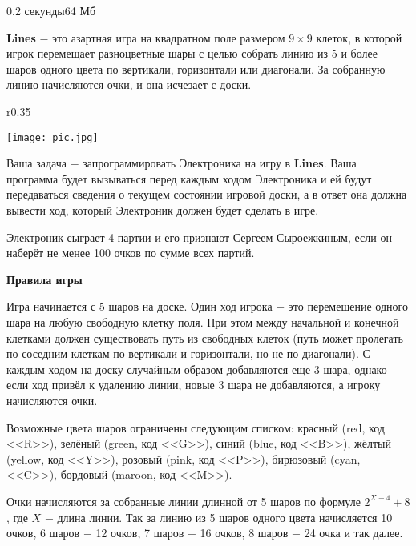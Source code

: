 \begin{problem}{}{}{}{0.2 секунды}{64 Мб}


{\bf {Lines}} $-$ это азартная игра на квадратном поле размером $9\times 9$ клеток, 
в которой игрок перемещает разноцветные шары с целью собрать линию из 5 и более шаров 
одного цвета по вертикали, горизонтали или диагонали. За собранную линию начисляются очки, и она исчезает с доски.

\begin{wrapfigure}{r}{0.35\textwidth}
\vspace{-20pt}
  \begin{center}
    \texttt{[image: pic.jpg]}
  \end{center}
  \vspace{-20pt}
  \vspace{1pt}
\end{wrapfigure}


Ваша задача $-$ запрограммировать Электроника на игру в {\bf {Lines}}. 
Ваша программа будет вызываться перед каждым ходом Электроника и ей будут передаваться сведения 
о текущем состоянии игровой доски, а в ответ она должна вывести ход, который Электроник должен будет сделать в игре.

Электроник сыграет 4 партии и его признают Сергеем Сыроежкиным, если он наберёт не менее 100 очков по сумме всех партий.

{\bf {Правила игры}}

Игра начинается с 5 шаров на доске. Один ход игрока $-$ это перемещение одного шара на любую свободную клетку поля. 
При этом между начальной и конечной клетками должен существовать путь из свободных клеток 
(путь может пролегать по соседним клеткам по вертикали и горизонтали, но не по диагонали). 
С каждым ходом на доску случайным образом добавляются еще 3 шара, однако если ход привёл к удалению линии, 
новые 3 шара не добавляются, а игроку начисляются очки. 

Возможные цвета шаров ограничены следующим списком: красный (red, код <<R>>), зелёный (green, код <<G>>), синий (blue, код <<B>>), 
жёлтый (yellow, код <<Y>>), розовый (pink, код <<P>>), бирюзовый (cyan, <<C>>), бордовый (maroon, код <<M>>).

Очки начисляются за собранные линии длинной от 5 шаров по формуле $2^{X-4}+8$, где $X$ $-$ длина линии. 
Так за линию из 5 шаров одного цвета начисляется 10 очков, 6 шаров $-$ 12 очков, 7 шаров $-$ 16 очков, 8 шаров $-$ 24 очка и так далее.


\end{problem}
